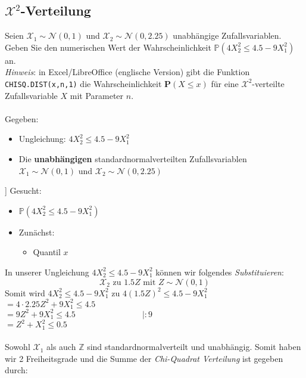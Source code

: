 \documentclass[a4paper]{article}
\begin{document}
\setcounter{section}{12}
\subsection{$\mathcal{X}^2$-Verteilung}
Seien $\mathcal{X}_1 \sim \mathcal{N}(0,1)$ und $\mathcal{X}_2 \sim \mathcal{N}(0,2.25)$ unabhängige Zufallsvariablen. Geben Sie den numerischen Wert der Wahrscheinlichkeit $\mathbb{P}(4X^2_2 \leq 4.5-9X^2_1)$ an.\\
\textit{Hinweis}: in Excel/LibreOﬃce (englische Version) gibt die Funktion \texttt{CHISQ.DIST(x,n,1)} die Wahrscheinlichkeit $\mathbf{P}(X \leq x)$ für eine $\mathcal{X}^2$-verteilte Zufallsvariable $X$ mit Parameter $n$.\\\\
Gegeben:
\begin{itemize}
    \item Ungleichung: $4X^2_2 \leq 4.5-9X^2_1$
    \item Die \textbf{unabhängigen} standardnormalverteilten Zufallsvariablen $\mathcal{X}_1 \sim \mathcal{N}(0,1)$ und $\mathcal{X}_2 \sim \mathcal{N}(0,2.25)$
\end{itemize}]
Gesucht:
\begin{itemize}
    \item $\mathbb{P}(4X^2_2 \leq 4.5-9X^2_1)$
    \item Zunächst:
    \begin{itemize}
        \item Quantil $x$
    \end{itemize}
\end{itemize}
In unserer Ungleichung $4X^2_2 \leq 4.5-9X^2_1$ können wir folgendes \textit{Substituieren}:\\
\[\mathcal{X}_2 \text{ zu } 1.5Z \text{ mit } Z \sim \mathcal{N}(0,1)\]
Somit wird $4X^2_2 \leq 4.5-9X^2_1$ zu $4(1.5Z)^2 \leq 4.5-9X^2_1$\\
\hspace*{3.57cm}$= 4 \cdot 2.25Z^2 + 9X_1^2 \leq 4.5$\\
\hspace*{3.57cm}$= 9Z^2 + 9X_1^2 \leq 4.5 \qquad\qquad\qquad\qquad \vert :9$\\
\hspace*{3.57cm}$= Z^2 + X_1^2 \leq 0.5$\\\\
Sowohl $\mathcal{X}_1$ als auch $\mathbb{Z}$ sind standardnormalverteilt und unabhängig. Somit haben wir 2 Freiheitsgrade und die Summe der \textit{Chi-Quadrat Verteilung} ist gegeben durch:
\end{document}
